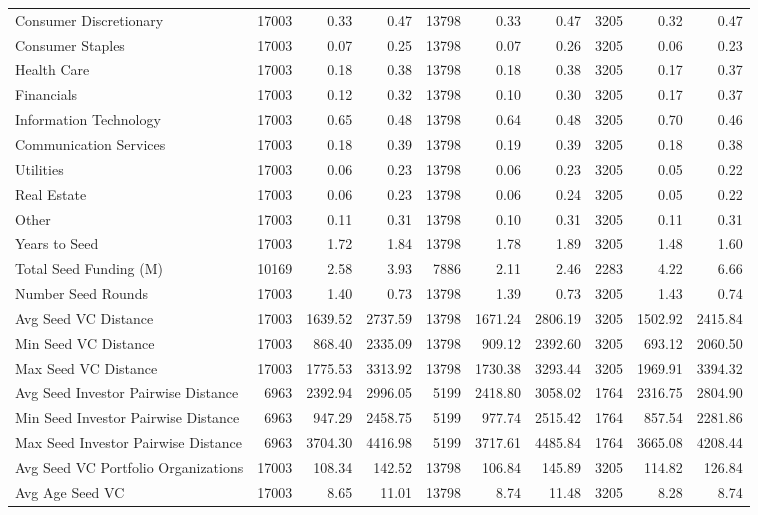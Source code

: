 \begin{table}[!h]
{\begin{tabular}[t]{lrrrrrrrrr}
Consumer Discretionary & 17003 & 0.33 & 0.47 & 13798 & 0.33 & 0.47 & 3205 & 0.32 & 0.47\\
Consumer Staples & 17003 & 0.07 & 0.25 & 13798 & 0.07 & 0.26 & 3205 & 0.06 & 0.23\\
Health Care & 17003 & 0.18 & 0.38 & 13798 & 0.18 & 0.38 & 3205 & 0.17 & 0.37\\
Financials & 17003 & 0.12 & 0.32 & 13798 & 0.10 & 0.30 & 3205 & 0.17 & 0.37\\
\addlinespace
Information Technology & 17003 & 0.65 & 0.48 & 13798 & 0.64 & 0.48 & 3205 & 0.70 & 0.46\\
Communication Services & 17003 & 0.18 & 0.39 & 13798 & 0.19 & 0.39 & 3205 & 0.18 & 0.38\\
Utilities & 17003 & 0.06 & 0.23 & 13798 & 0.06 & 0.23 & 3205 & 0.05 & 0.22\\
Real Estate & 17003 & 0.06 & 0.23 & 13798 & 0.06 & 0.24 & 3205 & 0.05 & 0.22\\
Other & 17003 & 0.11 & 0.31 & 13798 & 0.10 & 0.31 & 3205 & 0.11 & 0.31\\
\addlinespace
Years to Seed & 17003 & 1.72 & 1.84 & 13798 & 1.78 & 1.89 & 3205 & 1.48 & 1.60\\
Total Seed Funding (M) & 10169 & 2.58 & 3.93 & 7886 & 2.11 & 2.46 & 2283 & 4.22 & 6.66\\
Number Seed Rounds & 17003 & 1.40 & 0.73 & 13798 & 1.39 & 0.73 & 3205 & 1.43 & 0.74\\
Avg Seed VC Distance & 17003 & 1639.52 & 2737.59 & 13798 & 1671.24 & 2806.19 & 3205 & 1502.92 & 2415.84\\
Min Seed VC Distance & 17003 & 868.40 & 2335.09 & 13798 & 909.12 & 2392.60 & 3205 & 693.12 & 2060.50\\
\addlinespace
Max Seed VC Distance & 17003 & 1775.53 & 3313.92 & 13798 & 1730.38 & 3293.44 & 3205 & 1969.91 & 3394.32\\
Avg Seed Investor Pairwise Distance & 6963 & 2392.94 & 2996.05 & 5199 & 2418.80 & 3058.02 & 1764 & 2316.75 & 2804.90\\
Min Seed Investor Pairwise Distance & 6963 & 947.29 & 2458.75 & 5199 & 977.74 & 2515.42 & 1764 & 857.54 & 2281.86\\
Max Seed Investor Pairwise Distance & 6963 & 3704.30 & 4416.98 & 5199 & 3717.61 & 4485.84 & 1764 & 3665.08 & 4208.44\\
Avg Seed VC Portfolio Organizations & 17003 & 108.34 & 142.52 & 13798 & 106.84 & 145.89 & 3205 & 114.82 & 126.84\\
\addlinespace
Avg Age Seed VC & 17003 & 8.65 & 11.01 & 13798 & 8.74 & 11.48 & 3205 & 8.28 & 8.74\\

\end{tabular}}
\end{table}
